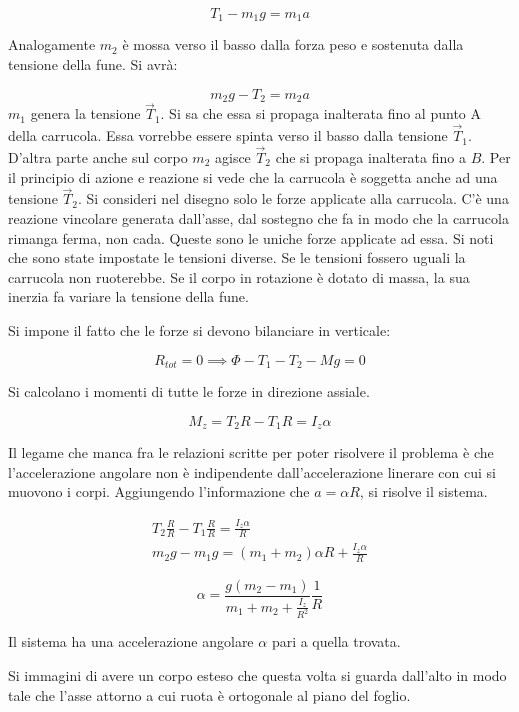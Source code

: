 \[
	T_1 - m_1 g = m_1 a
\]

Analogamente $m_2$ è mossa verso il basso dalla forza peso e sostenuta dalla tensione della fune. Si avrà:

\[
	m_2 g - T_2 = m_2 a
\]
$m_1$ genera la tensione $\vec{T}_1$. Si sa che essa si propaga inalterata fino al punto A della carrucola. Essa vorrebbe essere spinta verso il basso dalla tensione $\vec{T}_1$. D'altra parte anche sul corpo $m_2$ agisce $\vec{T}_2$ che si propaga inalterata fino a $B$. Per il principio di azione e reazione si vede che la carrucola è soggetta anche ad una tensione $\vec{T}_2$. Si consideri nel disegno solo le forze applicate alla carrucola. C'è una reazione vincolare generata dall'asse, dal sostegno che fa in modo che la carrucola rimanga ferma, non cada. Queste sono le uniche forze applicate ad essa. Si noti che sono state impostate le tensioni diverse. Se le tensioni fossero uguali la carrucola non ruoterebbe. Se il corpo in rotazione è dotato di massa, la sua inerzia fa variare la tensione della fune.

Si impone il fatto che le forze si devono bilanciare in verticale:

\[
	R_{tot} = 0 \implies \Phi - T_1 - T_2 - Mg = 0
\]

Si calcolano i momenti di tutte le forze in direzione assiale.

\[
	M_z = T_2 R - T_1 R = I_z\alpha
\]

Il legame che manca fra le relazioni scritte per poter risolvere il problema è che l'accelerazione angolare non è indipendente dall'accelerazione linerare con cui si muovono i corpi. Aggiungendo l'informazione che $a=\alpha R$, si risolve il sistema.

\begin{gather*}
	T_2\frac{R}{R} - T_1 \frac{R}{R} =  \frac{I_z \alpha  }{R} \\
	m_2 g - m_1 g = (m_1+m_2)\alpha R + \frac{I_z\alpha  }{R}
\end{gather*}

\[
	\boxed{\alpha = \frac{g(m_2-m_1)}{m_1+m_2+ \frac{I_z }{R^2}}\frac{1}{R}}
\]

Il sistema ha una accelerazione angolare $\alpha$ pari a quella trovata.

Si immagini di avere un corpo esteso che questa volta si guarda dall'alto in modo tale che l'asse attorno a cui ruota è ortogonale al piano del foglio.

